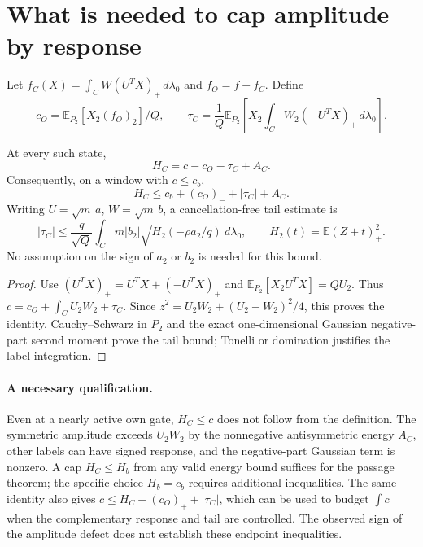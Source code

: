\documentclass[11pt]{article}
\numberwithin{equation}{section}
\theoremstyle{remark}\newtheorem{remark}[theorem]{Remark}
\newcommand{\dd}{\,d}\newcommand{\E}{\mathbb E}\newcommand{\R}{\mathbb R}
\begin{document}
\section{What is needed to cap amplitude by response}
Let $f_C(X)=\int_C W(U^TX)_+\dd\lambda_0$ and $f_O=f-f_C$. Define
\[
 c_O=\E_{P_2}[X_2(f_O)_2]/Q,\qquad
 \tau_C=\frac1Q\E_{P_2}\left[X_2\int_CW_2(-U^TX)_+\dd\lambda_0\right].
\]
\begin{proposition}\label{inc:AN03:clock:v1:endpoint}
At every such state,
\begin{equation}\label{inc:AN03:clock:v1:endpointidentity}
 H_C=c-c_O-\tau_C+A_C.
\end{equation}
Consequently, on a window with $c\le c_b$,
\begin{equation}\label{inc:AN03:clock:v1:Hcap}
 H_C\le c_b+(c_O)_-+|\tau_C|+A_C.
\end{equation}
Writing $U=\sqrt m\,a$, $W=\sqrt m\,b$, a cancellation-free tail estimate is
\[
 |\tau_C|\le\frac q{\sqrt Q}\int_Cm|b_2|
 \sqrt{H_2(-\rho a_2/q)}\dd\lambda_0,
 \qquad H_2(t)=\E(Z+t)_+^2.
\]
No assumption on the sign of $a_2$ or $b_2$ is needed for this bound.
\end{proposition}
\begin{proof}
Use $(U^TX)_+=U^TX+(-U^TX)_+$ and
$\E_{P_2}[X_2U^TX]=QU_2$. Thus $c=c_O+\int_CU_2W_2+\tau_C$.
Since $z^2=U_2W_2+(U_2-W_2)^2/4$, this proves the identity. Cauchy--Schwarz in $P_2$ and the exact one-dimensional Gaussian negative-part second moment prove the tail bound; Tonelli or domination justifies the label integration.
\end{proof}

\paragraph{A necessary qualification.}
Even at a nearly active own gate, $H_C\le c$ does not follow from the definition. The symmetric amplitude exceeds $U_2W_2$ by the nonnegative antisymmetric energy $A_C$, other labels can have signed response, and the negative-part Gaussian term is nonzero. A cap $H_C\le H_b$ from any valid energy bound suffices for the passage theorem; the specific choice $H_b=c_b$ requires additional inequalities. The same identity also gives $c\le H_C+(c_O)_++|\tau_C|$, which can be used to budget $\int c$ when the complementary response and tail are controlled. The observed sign of the amplitude defect does not establish these endpoint inequalities.
\end{document}
